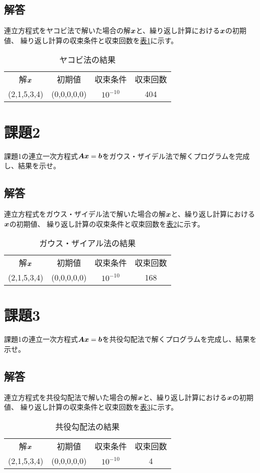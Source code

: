 \documentclass[]{jarticle}          %
\begin{document}
\subsection{解答}
連立方程式をヤコビ法で解いた場合の解$\mbox{\boldmath $x$}$と、繰り返し計算における$\mbox{\boldmath $x$}$の初期値、
繰り返し計算の収束条件と収束回数を\hyperref[one]{表\ref{one}}に示す。
\begin{table}[ht!]
  \begin{center}
    \begin{tabular}{cccc}
      解$\mbox{\boldmath $x$}$ & 初期値 & 収束条件 & 収束回数 \\
      (2,1,5,3,4) & (0,0,0,0,0) & $10^{-10}$ & 404 
    \end{tabular}
    \caption{ヤコビ法の結果}
    \label{one}
  \end{center}
\end{table}

\section{課題2}
課題1の連立一次方程式$\mbox{\boldmath $A$}\mbox{\boldmath $x$}=\mbox{\boldmath $b$}$をガウス・ザイデル法で解くプログラムを完成し、結果を示せ。
\subsection{解答}
連立方程式をガウス・ザイデル法で解いた場合の解$\mbox{\boldmath $x$}$と、繰り返し計算における$\mbox{\boldmath $x$}$の初期値、
繰り返し計算の収束条件と収束回数を\hyperref[two]{表\ref{two}}に示す。
\begin{table}[ht!]
  \begin{center}
    \begin{tabular}{cccc}
      解$\mbox{\boldmath $x$}$ & 初期値 & 収束条件 & 収束回数 \\
      (2,1,5,3,4) & (0,0,0,0,0) & $10^{-10}$ & 168
    \end{tabular}
    \caption{ガウス・ザイアル法の結果}
    \label{two}
  \end{center}
\end{table}

\section{課題3}
課題1の連立一次方程式$\mbox{\boldmath $A$}\mbox{\boldmath $x$}=\mbox{\boldmath $b$}$を共役勾配法で解くプログラムを完成し、結果を示せ。
\subsection{解答}
連立方程式を共役勾配法で解いた場合の解$\mbox{\boldmath $x$}$と、繰り返し計算における$\mbox{\boldmath $x$}$の初期値、
繰り返し計算の収束条件と収束回数を\hyperref[three]{表\ref{three}}に示す。
\begin{table}[ht!]
  \begin{center}
    \begin{tabular}{cccc}
      解$\mbox{\boldmath $x$}$ & 初期値 & 収束条件 & 収束回数 \\
      (2,1,5,3,4) & (0,0,0,0,0) & $10^{-10}$ & 4
    \end{tabular}
    \caption{共役勾配法の結果}
    \label{three}
  \end{center}
\end{table}
\end{document}
